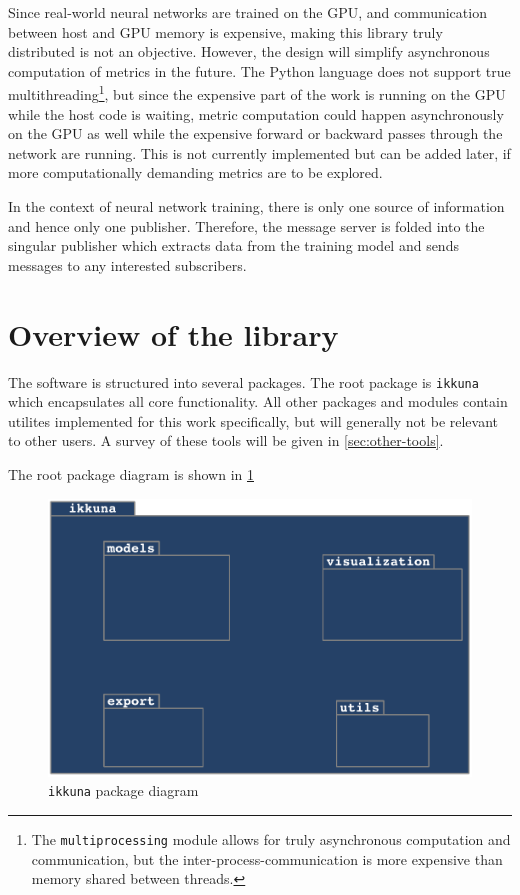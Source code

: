 Since real-world neural networks are trained on the GPU, and
communication between host and GPU memory is expensive, making this
library truly distributed is not an objective. However, the design will
simplify asynchronous computation of metrics in the future. The Python
language does not support true multithreading\footnote{The
    \texttt{multiprocessing} module allows for truly
    asynchronous computation and communication, but the
    inter-process-communication is more expensive than memory shared
between threads.}, but since the expensive part of the work is running
on the GPU while the host code is waiting, metric computation could
happen asynchronously on the GPU as well while the expensive forward or
backward passes through the network are running. This is not currently
implemented but can be added later, if more computationally demanding
metrics are to be explored.

In the context of neural network training, there is only one source of
information and hence only one publisher. Therefore, the message server
is folded into the singular publisher which extracts data from the
training model and sends messages to any interested subscribers.

\hypertarget{overview-of-the-library}{%
\section{Overview of the library}\label{overview-of-the-library}}

The software is structured into several packages. The root package is
\texttt{ikkuna} which encapsulates all core
functionality. All other packages and modules contain utilites
implemented for this work specifically, but will generally not be
relevant to other users. A survey of these tools will be given in
\cref{sec:other-tools}.

The root package diagram is shown in \cref{fig:pack-diag-ikkuna}

\begin{figure}
    \hypertarget{fig:pack-diag-ikkuna}{%
        \centering
        \includegraphics[max width=.5\textwidth]{gfx/diagrams/class_diagrams/ikkuna.pdf}
        \caption{\texttt{ikkuna} package diagram}\label{fig:pack-diag-ikkuna}
    }
\end{figure}

